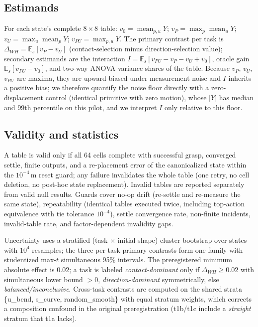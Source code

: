 \documentclass{article}
\begin{document}
\subsection{Estimands}
For each state's complete $8{\times}8$ table:
$v_0=\operatorname{mean}_{p,u} Y$;\;
$v_P=\max_p \operatorname{mean}_u Y$;\;
$v_U=\max_u \operatorname{mean}_p Y$;\;
$v_{PU}=\max_{p,u} Y$.
The primary contrast per task is
$\Delta_{WH}=\mathbb{E}_s[v_P-v_U]$ (contact-selection minus
direction-selection value); secondary estimands are the interaction
$I=\mathbb{E}_s[v_{PU}-v_P-v_U+v_0]$, oracle gain
$\mathbb{E}_s[v_{PU}-v_0]$, and two-way ANOVA variance shares of the table.
Because $v_P$, $v_U$, $v_{PU}$ are maxima, they are upward-biased under
measurement noise and $I$ inherits a positive bias; we therefore quantify the
noise floor directly with a zero-displacement control (identical primitive
with zero motion), whose $|Y|$ has median \zerodeltamed{} and 99th percentile
\zerodeltapninenine{} on this pilot, and we interpret $I$ only relative to
this floor.

\subsection{Validity and statistics}
A table is valid only if all 64 cells complete with successful grasp,
converged settle, finite outputs, and a re-placement error of the
canonicalized state within the $10^{-4}$\,m reset guard; any failure
invalidates the whole table (one retry, no cell deletion, no post-hoc state
replacement). Invalid tables
are reported separately from valid null results. Guards cover no-op drift
(re-settle and re-measure the same state), repeatability (identical tables
executed twice, including top-action equivalence with tie tolerance
$10^{-4}$), settle convergence rate, non-finite incidents, invalid-table rate,
and factor-dependent invalidity gaps.

Uncertainty uses a stratified (task $\times$ initial-shape) cluster bootstrap
over states with $10^4$ resamples; the three per-task primary contrasts form
one family with studentized max-$t$ simultaneous 95\% intervals. The
preregistered minimum absolute effect is $0.02$; a task is labeled
\emph{contact-dominant} only if $\Delta_{WH}\ge 0.02$ with simultaneous lower
bound $>0$, \emph{direction-dominant} symmetrically, else
\emph{balanced/inconclusive}. Cross-task contrasts are computed on the shared
strata \{u\_bend, s\_curve, random\_smooth\} with equal stratum weights, which
corrects a composition confound in the original preregistration (t1b/t1c
include a \emph{straight} stratum that t1a lacks).
\end{document}
